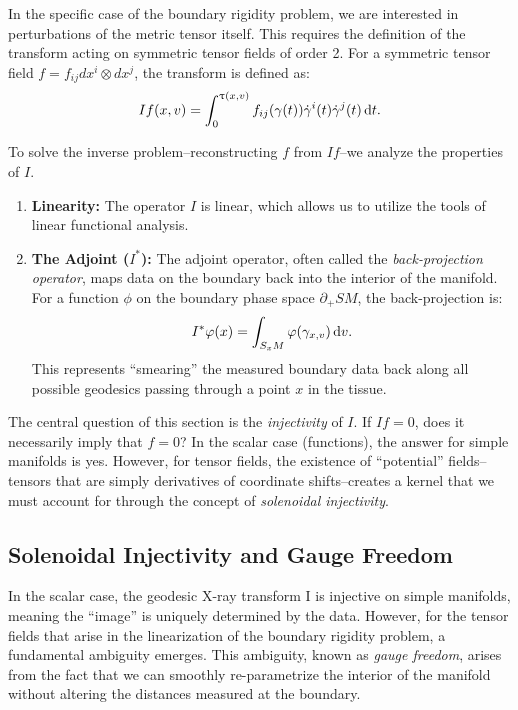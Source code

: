 In the specific case of the boundary rigidity problem, we are interested in perturbations of the metric tensor itself. This requires the definition of the transform acting on symmetric tensor fields of order 2. For a symmetric tensor field $f = f_{ij}dx^i \otimes dx^j$, the transform is defined as:
\[%
  If(x, v) = \int_{0}^{\tau(x, v)} f_{ij}(\gamma(t)) \dot{\gamma}^i(t) \dot{\gamma}^j(t) \dt
.\]%

To solve the inverse problem--reconstructing $f$ from $If$--we analyze the properties of $I$.
\begin{enumerate}
  \item \textbf{Linearity:} The operator $I$ is linear, which allows us to utilize the tools of linear functional analysis.
  \item \textbf{The Adjoint ($I^*$):} The adjoint operator, often called the \emph{back-projection operator}, maps data on the boundary back into the interior of the manifold. For a function $\phi$ on the boundary phase space $\partial_+ SM$, the back-projection is:
    \[%
      I^*\phi(x) = \int_{S_x M} \phi(\gamma_{x,v}) \dv
    .\]%
    This represents ``smearing'' the measured boundary data back along all possible geodesics passing through a point $x$ in the tissue.
\end{enumerate}

The central question of this section is the \emph{injectivity} of $I$. If $If = 0$, does it necessarily imply that $f = 0$? In the scalar case (functions), the answer for simple manifolds is yes. However, for tensor fields, the existence of ``potential'' fields--tensors that are simply derivatives of coordinate shifts--creates a kernel that we must account for through the concept of \emph{solenoidal injectivity}.

\subsection{Solenoidal Injectivity and Gauge Freedom}
\label{sub_sec:solenoidal_injectivity_and_gauge_freedom}

In the scalar case, the geodesic X-ray transform I is injective on simple manifolds, meaning the ``image'' is uniquely determined by the data. However, for the tensor fields that arise in the linearization of the boundary rigidity problem, a fundamental ambiguity emerges. This ambiguity, known as \emph{gauge freedom}, arises from the fact that we can smoothly re-parametrize the interior of the manifold without altering the distances measured at the boundary.

